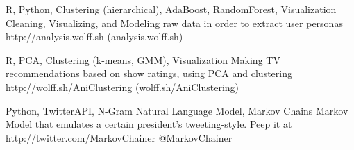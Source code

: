 \documentclass[10pt, letterpaper]{awesome-cv}
\begin{document}
\begin{projects}
    {R, Python, Clustering (hierarchical), AdaBoost, RandomForest, Visualization}
    {Cleaning, Visualizing, and Modeling raw data in order to extract user personas}
    {http://analysis.wolff.sh}
    {(analysis.wolff.sh)}   
    
    {R, PCA, Clustering (k-means, GMM), Visualization}
    {Making TV recommendations based on show ratings, using PCA and clustering}
    {http://wolff.sh/AniClustering}
    {(wolff.sh/AniClustering)}
    
    {Python, TwitterAPI, N-Gram Natural Language Model, Markov Chains}
    {Markov Model that emulates a certain president's tweeting-style. Peep it at}
    {http://twitter.com/MarkovChainer}
    {@MarkovChainer}
    
    
    
\end{projects}
    
\end{document}
